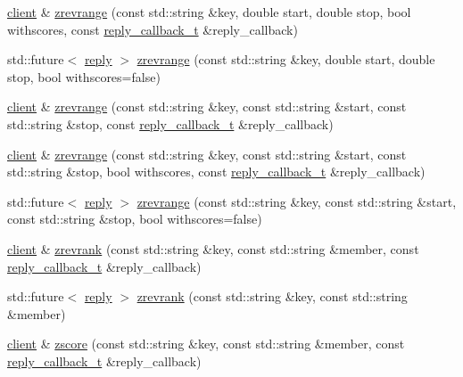 \begin{DoxyCompactItemize}
\item 
\hyperlink{classcpp__redis_1_1client}{client} \& \hyperlink{classcpp__redis_1_1client_ac03871ced545f10c9f277fd5fc20f0a0}{zrevrange} (const std\+::string \&key, double start, double stop, bool withscores, const \hyperlink{classcpp__redis_1_1client_a061a1140d36d2eaeda82b09a0bb3f9f2}{reply\+\_\+callback\+\_\+t} \&reply\+\_\+callback)
\item 
std\+::future$<$ \hyperlink{classcpp__redis_1_1reply}{reply} $>$ \hyperlink{classcpp__redis_1_1client_a85aa18b29763edd1d93c4b463b6b3a51}{zrevrange} (const std\+::string \&key, double start, double stop, bool withscores=false)
\item 
\hyperlink{classcpp__redis_1_1client}{client} \& \hyperlink{classcpp__redis_1_1client_ab72a94b6f16cb23cf39275bfc9e35385}{zrevrange} (const std\+::string \&key, const std\+::string \&start, const std\+::string \&stop, const \hyperlink{classcpp__redis_1_1client_a061a1140d36d2eaeda82b09a0bb3f9f2}{reply\+\_\+callback\+\_\+t} \&reply\+\_\+callback)
\item 
\hyperlink{classcpp__redis_1_1client}{client} \& \hyperlink{classcpp__redis_1_1client_ae4cef5e8cba4196287bf89375889a2e4}{zrevrange} (const std\+::string \&key, const std\+::string \&start, const std\+::string \&stop, bool withscores, const \hyperlink{classcpp__redis_1_1client_a061a1140d36d2eaeda82b09a0bb3f9f2}{reply\+\_\+callback\+\_\+t} \&reply\+\_\+callback)
\item 
std\+::future$<$ \hyperlink{classcpp__redis_1_1reply}{reply} $>$ \hyperlink{classcpp__redis_1_1client_a973fb4632a18f70bec092f3c9659045e}{zrevrange} (const std\+::string \&key, const std\+::string \&start, const std\+::string \&stop, bool withscores=false)
\item 
\hyperlink{classcpp__redis_1_1client}{client} \& \hyperlink{classcpp__redis_1_1client_a459f90ba39d9f9e90df5b756ec25db8b}{zrevrank} (const std\+::string \&key, const std\+::string \&member, const \hyperlink{classcpp__redis_1_1client_a061a1140d36d2eaeda82b09a0bb3f9f2}{reply\+\_\+callback\+\_\+t} \&reply\+\_\+callback)
\item 
std\+::future$<$ \hyperlink{classcpp__redis_1_1reply}{reply} $>$ \hyperlink{classcpp__redis_1_1client_a9870e21048277805b5eac2ce710089a0}{zrevrank} (const std\+::string \&key, const std\+::string \&member)
\item 
\hyperlink{classcpp__redis_1_1client}{client} \& \hyperlink{classcpp__redis_1_1client_a5e0a18243dee60595c82fc4a630f6d86}{zscore} (const std\+::string \&key, const std\+::string \&member, const \hyperlink{classcpp__redis_1_1client_a061a1140d36d2eaeda82b09a0bb3f9f2}{reply\+\_\+callback\+\_\+t} \&reply\+\_\+callback)

\end{DoxyCompactItemize}
